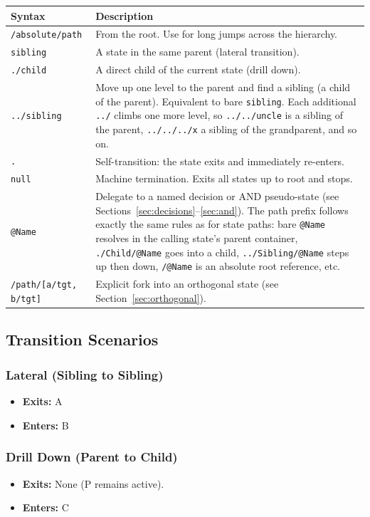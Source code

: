 \documentclass[a4paper,11pt]{article}
\begin{document}
\begin{longtable}{@{}lp{10cm}@{}}
\toprule
\textbf{Syntax} & \textbf{Description} \\
\midrule
\endhead
\texttt{/absolute/path} & From the root. Use for long jumps across the hierarchy. \\
\texttt{sibling} & A state in the same parent (lateral transition). \\
\texttt{./child} & A direct child of the current state (drill down). \\
\texttt{../sibling} & Move up one level to the parent and find a sibling (a child of the parent). Equivalent to bare \texttt{sibling}. Each additional \texttt{../} climbs one more level, so \texttt{../../uncle} is a sibling of the parent, \texttt{../../../x} a sibling of the grandparent, and so on. \\
\texttt{.} & Self-transition: the state exits and immediately re-enters. \\
\texttt{null} & Machine termination. Exits all states up to root and stops. \\
\texttt{@Name} & Delegate to a named decision or AND pseudo-state (see Sections~\ref{sec:decisions}--\ref{sec:and}). The path prefix follows exactly the same rules as for state paths: bare \texttt{@Name} resolves in the calling state's parent container, \texttt{./Child/@Name} goes into a child, \texttt{../Sibling/@Name} steps up then down, \texttt{/@Name} is an absolute root reference, etc. \\
\texttt{/path/[a/tgt, b/tgt]} & Explicit fork into an orthogonal state (see Section~\ref{sec:orthogonal}). \\
\bottomrule
\end{longtable}

\subsection{Transition Scenarios}

\subsubsection*{Lateral (Sibling to Sibling)}
\begin{itemize}
    \item \textbf{Exits:} A
    \item \textbf{Enters:} B
\end{itemize}

\subsubsection*{Drill Down (Parent to Child)}
\begin{itemize}
    \item \textbf{Exits:} None (P remains active).
    \item \textbf{Enters:} C
\end{itemize}
\end{document}
